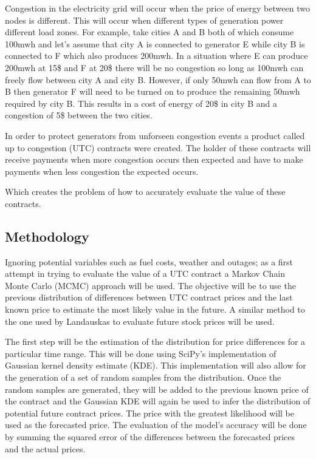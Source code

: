 \documentclass{report}
\begin{document}
Congestion in the electricity grid will occur when the price of energy between
two nodes is different. This will occur when different types of generation power
different load zones. For example, take cities A and B both of which consume
100mwh and let's assume that city A is connected to generator E while city B is connected to
 F which also produces 200mwh. In a situation where E can produce 200mwh at
15\$ and F at 20\$ there will be no congestion so long as 100mwh can freely flow
between city A and city B. However, if only 50mwh can flow
from A to B then generator F will need to be turned on to produce the remaining
50mwh required by city B. This results in a cost of energy
of 20\$ in city B and a congestion of 5\$ between the two cities.

In order to protect generators from unforseen congestion events a product called
up to congestion (UTC) contracts were created. The holder of these contracts will
receive payments when more congestion occurs then expected and have to make payments
when less congestion the expected occurs.

Which creates the problem of how to accurately evaluate the value of these contracts.

\subsection*{Methodology}
Ignoring potential variables such as fuel costs, weather and outages; as a first
attempt in trying to evaluate the value of a UTC contract a Markov
Chain Monte Carlo (MCMC) approach will be used. The objective will be to use the
previous distribution of differences between UTC contract prices and the last
known price to estimate the most likely value in the future. A similar method to
the one used by Landauskas \cite{landauskas} to evaluate future stock prices will
be used.

The first step will be the estimation of the distribution for price differences
for a particular time range. This will be done using SciPy's \cite{scipy}
implementation of Gaussian kernel density estimate (KDE). This implementation will
also allow for the generation of a set of random samples from the distribution.
Once the random samples are generated, they will be added to the previous known
price of the contract and the Gaussian KDE will again be used to infer the
distribution of potential future contract prices. The price with the greatest
likelihood will be used as the forecasted price. The evaluation of the model's accuracy will
be done by summing the squared error of the differences between the forecasted prices
and the actual prices.
\end{document}
